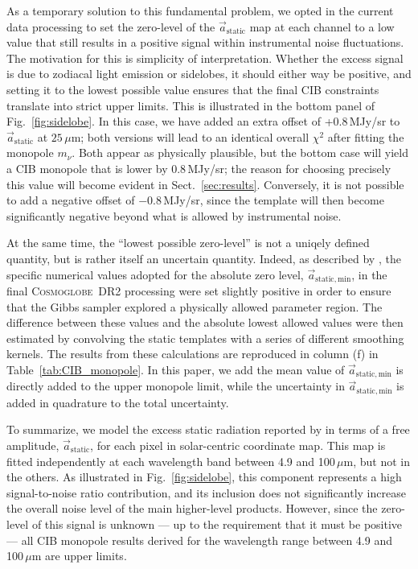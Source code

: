 \documentclass{aa}
\renewcommand{\a}[0]{\vec{a}}
\newcommand{\cosmoglobe}{\textsc{Cosmoglobe}}
\begin{document}
As a temporary solution to this fundamental problem, we opted in the
current data processing to set the zero-level of the
$\a_{\mathrm{static}}$ map at each channel to a low value that still
results in a positive signal within instrumental noise
fluctuations. The motivation for this is simplicity of
interpretation. Whether the excess signal is due to zodiacal light
emission or sidelobes, it should either way be positive, and setting
it to the lowest possible value ensures that the final CIB constraints
translate into strict upper limits. This is illustrated in the bottom
panel of Fig.~\ref{fig:sidelobe}. In this case, we have added an extra
offset of +0.8\,MJy/sr to $\a_{\mathrm{static}}$ at
$25\,\mu\mathrm{m}$; both versions will lead to an identical overall
$\chi^2$ after fitting the monopole $m_{\nu}$.  Both appear as
physically plausible, but the bottom case will yield a CIB monopole
that is lower by 0.8\,MJy/sr; the reason for choosing precisely this
value will become evident in Sect.~\ref{sec:results}. Conversely, it
is not possible to add a negative offset of $-0.8$\,MJy/sr, since the
template will then become significantly negative beyond what is
allowed by instrumental noise.

At the same time, the ``lowest possible zero-level'' is not a uniqely
defined quantity, but is rather itself an uncertain quantity. Indeed,
as described by \citet{CG02_01}, the specific numerical values adopted
for the absolute zero level, $\a_{\mathrm{static,min}}$, in the final
\cosmoglobe\ DR2 processing were set slightly positive in order to
ensure that the Gibbs sampler explored a physically allowed parameter
region. The difference between these values and the absolute lowest
allowed values were then estimated by convolving the static templates
with a series of different smoothing kernels. The results from these
calculations are reproduced in column (f) in
Table~\ref{tab:CIB_monopole}. In this paper, we add the mean value of
$\a_{\mathrm{static,min}}$ is directly added to the upper monopole
limit, while the uncertainty in $\a_{\mathrm{static,min}}$ is added in
quadrature to the total uncertainty.

To summarize, we model the excess static radiation reported by in
terms of a free amplitude, $\a_{\mathrm{static}}$, for each pixel in
solar-centric coordinate map. This map is fitted independently at each
wavelength band between 4.9 and 100$\,\mu\mathrm{m}$, but not in the
others. As illustrated in Fig.~\ref{fig:sidelobe}, this component
represents a high signal-to-noise ratio contribution, and its
inclusion does not significantly increase the overall noise level of
the main higher-level products. However, since the zero-level of this
signal is unknown --- up to the requirement that it must be positive
--- all CIB monopole results derived for the wavelength range between
4.9 and 100$\,\mu\mathrm{m}$ are upper limits. 
\end{document}
